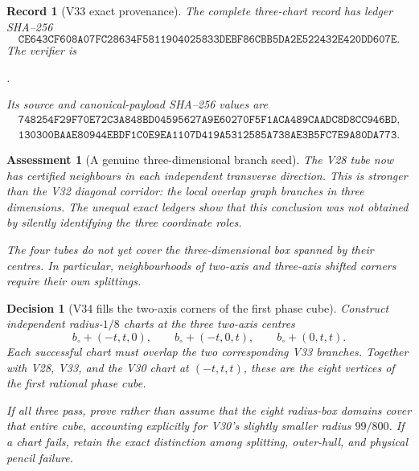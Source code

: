 \documentclass[11pt,oneside]{article}
\newtheorem{assessment}[theorem]{Assessment}
\newtheorem{record}[theorem]{Record}
\newtheorem{decision}[theorem]{Decision}
\theoremstyle{definition}
\theoremstyle{remark}
\begin{document}
\begin{record}[V33 exact provenance]
\label{rec:newv33-provenance}
The complete three-chart record has ledger SHA--256
\[
\texttt{CE643CF608A07FC28634F5811904025833DEBF86CBB5DA2E522432E420DD607E}.
                                                               \tag{33.17}
\]
The verifier is
\begin{center}
\footnotesize
{}.
\end{center}
Its source and canonical-payload SHA--256 values are
\[
\begin{gathered}
\texttt{748254F29F70E72C3A848BD04595627A9E60270F5F1ACA489CAADC8D8CC946BD},\\
\texttt{130300BAAE80944EBDF1C0E9EA1107D419A5312585A738AE3B5FC7E9A80DA773}.
\end{gathered}                                          \tag{33.18}
\]
\end{record}

\begin{assessment}[A genuine three-dimensional branch seed]
\label{ass:newv33}
The V28 tube now has certified neighbours in each independent
transverse direction.  This is stronger than the V32 diagonal
corridor: the local overlap graph branches in three dimensions.
The unequal exact ledgers show that this conclusion was not obtained
by silently identifying the three coordinate roles.

The four tubes do not yet cover the three-dimensional box spanned by
their centres.  In particular, neighbourhoods of two-axis and
three-axis shifted corners require their own splittings.
\end{assessment}

\begin{decision}[V34 fills the two-axis corners of the first phase cube]
\label{dec:newv33-next}
Construct independent radius-\(1/8\) charts at the three two-axis
centres
\[
 b_\circ+(-t,t,0),\qquad
 b_\circ+(-t,0,t),\qquad
 b_\circ+(0,t,t).                                      \tag{33.19}
\]
Each successful chart must overlap the two corresponding V33
branches.  Together with V28, V33, and the V30 chart at
\((-t,t,t)\), these are the eight vertices of the first rational
phase cube.

If all three pass, prove rather than assume that the eight
radius-box domains cover that entire cube, accounting explicitly for
V30's slightly smaller radius \(99/800\).  If a chart fails, retain
the exact distinction among splitting, outer-hull, and physical
pencil failure.
\end{decision}
\end{document}
